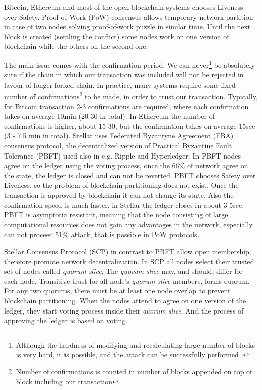 \documentclass[nostrict]{szablonPG}
\begin{document}


Bitcoin, Ethereum and most of the open blockchain systems chooses Liveness over Safety. Proof-of-Work (PoW) consensus allows temporary network partition in case of two nodes solving proof-of-work puzzle in similar time. Until the next block is created (settling the conflict) some nodes work on one version of blockchain while the others on the second one.

The main issue comes with the confirmation period. We can never\footnote{Although the hardness of modifying and recalculating large number of blocks is very hard, it is possible, and the attack can be successfully performed \cite{sayeed2019assessing}.} be absolutely sure if the chain in which our transaction was included will not be rejected in favour of longer forked chain. In practice, many systems require some fixed number of confirmations\footnote{Number of confirmations is counted in number of blocks appended on top of block including our transaction} to be made, in order to trust our transaction. Typically, for Bitcoin transaction 2-3 confirmations are required, where each confirmation takes on average 10min (20-30 in total). In Ethereum the number of confirmations is higher, about 15-30, but the confirmation takes on average 15sec (3 - 7.5 min in total). Stellar uses Federated Byzantyne Agreement (FBA) consensus protocol, the decentralized version of Practical Byzantine Fault Tolerance (PBFT) \cite{castro1999practical} used also in e.g. Ripple and Hyperledger. In PBFT nodes agree on the ledger using the voting process, once the 66\% of network agree on the state, the ledger is closed and can not be reverted. PBFT chooses Safety over Liveness, so the problem of blockchain partitioning does not exist. Once the transaction is approved by blockchain it can not change its state. Also the confirmation speed is much faster, in Stellar the ledger closes in about 3-5sec. PBFT is asymptotic resistant, meaning that the node consisting of large computational resources does not gain any advantages in the network, especially can not proceed 51\% attack, that is possible in PoW protocols. 

Stellar Consensus Protocol (SCP) in contrast to PBFT allow open membership, therefore promote network decentralization. In SCP all nodes select their trusted set of nodes called \textit{quorum slice}. The \textit{quorum slice} may, and should, differ for each node. Transitive trust for all node's \textit{quorum-slice} members, forms quorum. For any two quorums, there must be at least one node overlap to prevent blockchain partitioning. When the nodes attend to agree on one version of the ledger, they start voting process inside their \textit{quorum slice}. And the process of approving the ledger is based on voting. 
\end{document}
